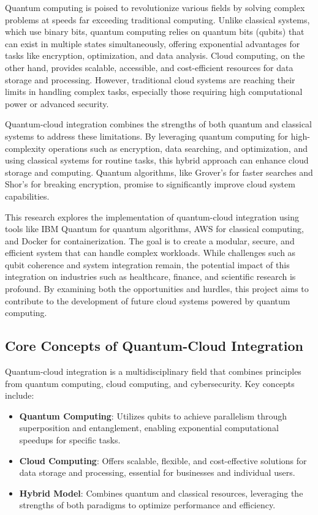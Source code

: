 \documentclass[12pt,a4paper]{article}
\begin{document}
    Quantum computing is poised to revolutionize various fields by solving complex problems at speeds far exceeding traditional computing. Unlike classical systems, which use binary bits, quantum computing relies on quantum bits (qubits) that can exist in multiple states simultaneously, offering exponential advantages for tasks like encryption, optimization, and data analysis. Cloud computing, on the other hand, provides scalable, accessible, and cost-efficient resources for data storage and processing. However, traditional cloud systems are reaching their limits in handling complex tasks, especially those requiring high computational power or advanced security.

    Quantum-cloud integration combines the strengths of both quantum and classical systems to address these limitations. By leveraging quantum computing for high-complexity operations such as encryption, data searching, and optimization, and using classical systems for routine tasks, this hybrid approach can enhance cloud storage and computing. Quantum algorithms, like Grover’s for faster searches and Shor’s for breaking encryption, promise to significantly improve cloud system capabilities.
    
    This research explores the implementation of quantum-cloud integration using tools like IBM Quantum for quantum algorithms, AWS for classical computing, and Docker for containerization. The goal is to create a modular, secure, and efficient system that can handle complex workloads. While challenges such as qubit coherence and system integration remain, the potential impact of this integration on industries such as healthcare, finance, and scientific research is profound. By examining both the opportunities and hurdles, this project aims to contribute to the development of future cloud systems powered by quantum computing.

\subsection{Core Concepts of Quantum-Cloud Integration}
Quantum-cloud integration is a multidisciplinary field that combines principles from quantum computing, cloud computing, and cybersecurity. Key concepts include:
\begin{itemize}
    \item \textbf{Quantum Computing}: Utilizes qubits to achieve parallelism through superposition and entanglement, enabling exponential computational speedups for specific tasks.
    \item \textbf{Cloud Computing}: Offers scalable, flexible, and cost-effective solutions for data storage and processing, essential for businesses and individual users.
    \item \textbf{Hybrid Model}: Combines quantum and classical resources, leveraging the strengths of both paradigms to optimize performance and efficiency.
\end{itemize}
\end{document}
